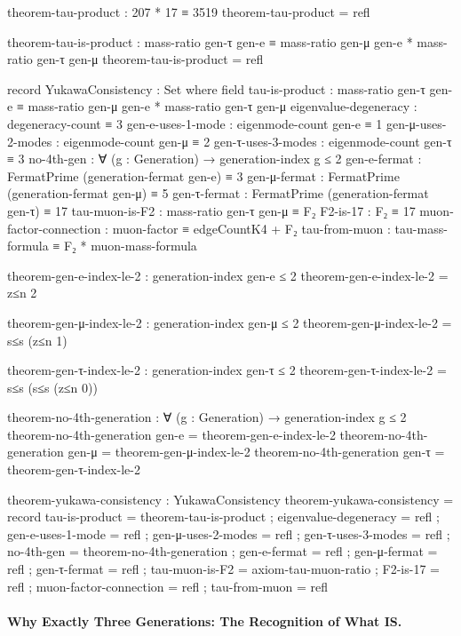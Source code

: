 \documentclass[11pt,a4paper]{book}
\begin{document}
\begin{code}
theorem-tau-product : 207 * 17 ≡ 3519
theorem-tau-product = refl

theorem-tau-is-product : mass-ratio gen-τ gen-e ≡ 
                         mass-ratio gen-μ gen-e * mass-ratio gen-τ gen-μ
theorem-tau-is-product = refl

record YukawaConsistency : Set where
  field
    tau-is-product : mass-ratio gen-τ gen-e ≡ 
                     mass-ratio gen-μ gen-e * mass-ratio gen-τ gen-μ
    eigenvalue-degeneracy : degeneracy-count ≡ 3
    gen-e-uses-1-mode : eigenmode-count gen-e ≡ 1
    gen-μ-uses-2-modes : eigenmode-count gen-μ ≡ 2
    gen-τ-uses-3-modes : eigenmode-count gen-τ ≡ 3
    no-4th-gen : ∀ (g : Generation) → generation-index g ≤ 2
    gen-e-fermat : FermatPrime (generation-fermat gen-e) ≡ 3
    gen-μ-fermat : FermatPrime (generation-fermat gen-μ) ≡ 5
    gen-τ-fermat : FermatPrime (generation-fermat gen-τ) ≡ 17
    tau-muon-is-F2 : mass-ratio gen-τ gen-μ ≡ F₂
    F2-is-17 : F₂ ≡ 17
    muon-factor-connection : muon-factor ≡ edgeCountK4 + F₂
    tau-from-muon : tau-mass-formula ≡ F₂ * muon-mass-formula

theorem-gen-e-index-le-2 : generation-index gen-e ≤ 2
theorem-gen-e-index-le-2 = z≤n {2}

theorem-gen-μ-index-le-2 : generation-index gen-μ ≤ 2
theorem-gen-μ-index-le-2 = s≤s (z≤n {1})

theorem-gen-τ-index-le-2 : generation-index gen-τ ≤ 2
theorem-gen-τ-index-le-2 = s≤s (s≤s (z≤n {0}))

theorem-no-4th-generation : ∀ (g : Generation) → generation-index g ≤ 2
theorem-no-4th-generation gen-e = theorem-gen-e-index-le-2
theorem-no-4th-generation gen-μ = theorem-gen-μ-index-le-2
theorem-no-4th-generation gen-τ = theorem-gen-τ-index-le-2

theorem-yukawa-consistency : YukawaConsistency
theorem-yukawa-consistency = record
  { tau-is-product = theorem-tau-is-product
  ; eigenvalue-degeneracy = refl
  ; gen-e-uses-1-mode = refl
  ; gen-μ-uses-2-modes = refl
  ; gen-τ-uses-3-modes = refl
  ; no-4th-gen = theorem-no-4th-generation
  ; gen-e-fermat = refl
  ; gen-μ-fermat = refl
  ; gen-τ-fermat = refl
  ; tau-muon-is-F2 = axiom-tau-muon-ratio
  ; F2-is-17 = refl
  ; muon-factor-connection = refl
  ; tau-from-muon = refl
  }
\end{code}

\paragraph{Why Exactly Three Generations: The Recognition of What IS.}
\end{document}
